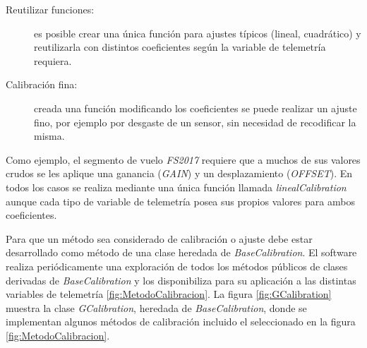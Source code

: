 \documentclass[twoside,twocolumn]{article}
\begin{document}
\begin{description}
 \item [Reutilizar funciones: ] es posible crear una única función para ajustes típicos (lineal, cuadrático) y reutilizarla con distintos coeficientes según la variable de telemetría requiera.
 \item [Calibración fina: ] creada una función modificando los coeficientes se puede realizar un ajuste fino, por ejemplo por desgaste de un sensor, sin necesidad de recodificar la misma.
\end{description}

Como ejemplo, el segmento de vuelo \textit{FS2017} requiere que a muchos de sus valores crudos se les aplique una ganancia (\textit{GAIN}) y un desplazamiento (\textit{OFFSET}). En todos los casos se realiza mediante una única función llamada \textit{linealCalibration} aunque cada tipo de variable de telemetría posea sus propios valores para ambos coeficientes.

Para que un método sea considerado de calibración o ajuste debe estar desarrollado como método de una clase heredada de \textit{BaseCalibration}. El software realiza periódicamente una exploración de todos los métodos públicos de clases derivadas de \textit{BaseCalibration} y los disponibiliza para su aplicación a las distintas variables de telemetría \ref{fig:MetodoCalibracion}. La figura \ref{fig:GCalibration} muestra la clase \textit{GCalibration}, heredada de \textit{BaseCalibration}, donde se implementan algunos métodos de calibración incluido el seleccionado en la figura \ref{fig:MetodoCalibracion}.
\end{document}
